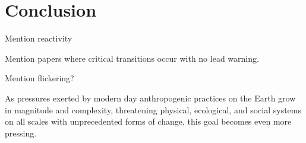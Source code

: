 \section{Conclusion}
\label{sec:conclusion}


Mention reactivity

Mention papers where critical transitions occur with no lead warning.

Mention flickering?

As pressures exerted by modern day anthropogenic practices on the Earth grow in magnitude and complexity, threatening physical, ecological, and social systems on all scales with unprecedented forms of change, this goal becomes even more pressing. 